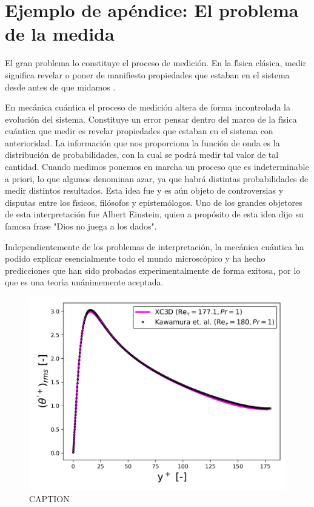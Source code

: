 \chapter{Ejemplo de ap\'{e}ndice: El problema de la medida}\label{C:ap1}
\graphicspath{{figs/}}
El gran problema lo constituye el proceso de medici\'{o}n. En la f\'{\i}sica cl\'{a}sica, medir significa revelar o poner de manifiesto propiedades que estaban en el sistema desde antes de que midamos \cite{Philipp1982NCBSp75}.

En mec\'{a}nica cu\'{a}ntica el proceso de medici\'{o}n altera de forma incontrolada la evoluci\'{o}n del sistema. Constituye un error pensar dentro del marco de la f\'{\i}sica cu\'{a}ntica que medir es revelar propiedades que estaban en el sistema con anterioridad. La informaci\'{o}n que nos proporciona la funci\'{o}n de onda es la distribuci\'{o}n de probabilidades, con la cual se podr\'{a} medir tal valor de tal cantidad. Cuando medimos ponemos en marcha un proceso que es indeterminable a priori, lo que algunos denominan azar, ya que habr\'{a} distintas probabilidades de medir distintos resultados. Esta idea fue y es a\'{u}n objeto de controversias y disputas entre los f\'{\i}sicos, fil\'{o}sofos y epistem\'{o}logos. Uno de los grandes objetores de esta interpretaci\'{o}n fue Albert Einstein, quien a prop\'{o}sito de esta idea dijo su famosa frase "Dios no juega a los dados".

Independientemente de los problemas de interpretaci\'{o}n, la mec\'{a}nica cu\'{a}ntica ha podido explicar esencialmente todo el mundo microsc\'{o}pico y ha hecho predicciones que han sido probadas experimentalmente de forma exitosa, por lo que es una teor\'{\i}a un\'{a}nimemente aceptada.

\begin{figure}[ht]
\centering{}
\includegraphics[width=\imsize]{results/Ret180_Pr1_theta_rms.png}
\caption{CAPTION}
\label{fig:apend}  
\end{figure}



